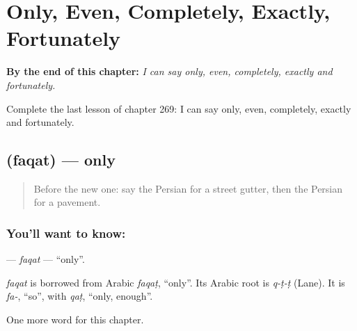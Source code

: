 
\chapter{Only, Even, Completely, Exactly, Fortunately}
\label{ch:fa-only-even-completely-exactly-fortunately}

\begin{chapteropening}
\textbf{By the end of this chapter:} \emph{I can say only, even, completely, exactly and fortunately.}

Complete the last lesson of chapter 269: I can say only, even, completely, exactly and fortunately.
\end{chapteropening}

\section[\texorpdfstring{\fa{فقط} (faqat)}{فقط (faqat)}]{ (faqat) — only}

\label{lesson:FA-C269-faqat}



\begin{quote}
Before the new one: say the Persian for a street gutter, then the Persian for a pavement.
\end{quote}

\subsection*{You'll want to know: }
\textbf{} — \emph{faqat} — \textquotedblleft{}only\textquotedblright{}.

\begin{cousinweb}
\emph{faqat} is borrowed from Arabic \emph{faqaṭ}, \textquotedblleft{}only\textquotedblright{}. Its Arabic root is \emph{q-ṭ-ṭ} (Lane). It is \emph{fa-}, \textquotedblleft{}so\textquotedblright{}, with \emph{qaṭ}, \textquotedblleft{}only, enough\textquotedblright{}.
\end{cousinweb}

\begin{grammarlens}[title={What you've built}]
One more word for this chapter.
\end{grammarlens}

